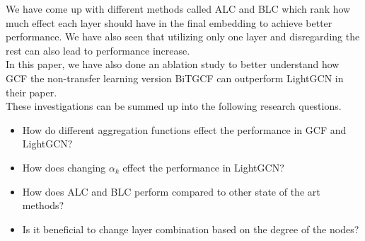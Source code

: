 We have come up with different methods called ALC and BLC which rank how much effect each layer should have in the final embedding to achieve better performance.
We have also seen that utilizing only one layer and disregarding the rest can also lead to performance increase.
\\
In this paper, we have also done an ablation study to better understand how GCF the non-transfer learning version BiTGCF can outperform LightGCN in their paper.
\\
These investigations can be summed up into the following research questions.
\begin{itemize}
    \item How do different aggregation functions effect the performance in GCF and LightGCN?
    \item How does changing $\alpha_k$ effect the performance in LightGCN?
    \item How does ALC and BLC perform compared to other state of the art methods?
    \item Is it beneficial to change layer combination based on the degree of the nodes?
\end{itemize}
